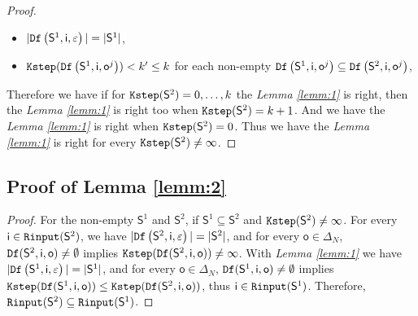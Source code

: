 \begin{appendices}
\begin{proof}
\begin{itemize}
 \item  $|{\tt Df}\left(\mathsf{S}^{1},\mathsf{i},\varepsilon\right)|=|\mathsf{S}^1|$,
 \item  ${\tt Kstep}({\tt Df}\left(\mathsf{S}^{1},\mathsf{i},\mathsf{o}^{j}\right))<k'\le k$ for each non-empty ${\tt Df}\left(\mathsf{S}^{1},\mathsf{i},\mathsf{o}^{j}\right)\subseteq {\tt Df}\left(\mathsf{S}^{2},\mathsf{i},\mathsf{o}^{j}\right)$,
 \end{itemize} 
 Therefore we have if for ${\tt Kstep}(\mathsf{S}^{2})=0,\ldots, k$ the {\em Lemma \ref{lemm:1}} is right, then the {\em Lemma \ref{lemm:1}} is right too when ${\tt Kstep}(\mathsf{S}^{2})=k+1$. 
And we have the {\em Lemma \ref{lemm:1}} is right when ${\tt Kstep}(\mathsf{S}^{2})=0$. Thus we have the {\em Lemma \ref{lemm:1}} is right for every ${\tt Kstep}(\mathsf{S}^{2})\ne \infty$.
 
\end{proof}
\subsection{Proof of Lemma \ref{lemm:2}}
\begin{proof}
For the non-empty $\mathsf{S}^{1}$ and $\mathsf{S}^{2}$, if $\mathsf{S}^{1}\subseteq\mathsf{S}^{2}$ and ${\tt Kstep}(\mathsf{S}^{2})\ne\infty$.
For every $\mathsf{i}\in {\tt Rinput}(\mathsf{S}^2)$, we have  $|{\tt Df}\left(\mathsf{S}^2,\mathsf{i},\varepsilon\right)|=|\mathsf{S}^2|$, and 
for every $\mathsf{o} \in \Delta_N$, ${\tt Df}(\mathsf{S}^2,\mathsf{i},\mathsf{o})\ne \emptyset$ implies ${\tt Kstep}({\tt Df}(\mathsf{S}^2,\mathsf{i},\mathsf{o}))\ne \infty$. With {\em Lemma \ref{lemm:1}} we have $|{\tt Df}\left(\mathsf{S}^1,\mathsf{i},\varepsilon\right)|=|\mathsf{S}^1|$, and 
for every $\mathsf{o} \in \Delta_N$, ${\tt Df}(\mathsf{S}^1,\mathsf{i},\mathsf{o})\ne \emptyset$ implies ${\tt Kstep}({\tt Df}(\mathsf{S}^1,\mathsf{i},\mathsf{o}))\le {\tt Kstep}({\tt Df}(\mathsf{S}^2,\mathsf{i},\mathsf{o}))$, thus $\mathsf{i}\in {\tt Rinput}(\mathsf{S}^1)$. Therefore, ${\tt Rinput}(\mathsf{S}^2)\subseteq{\tt Rinput}(\mathsf{S}^1)$.
\end{proof}



\end{appendices}
